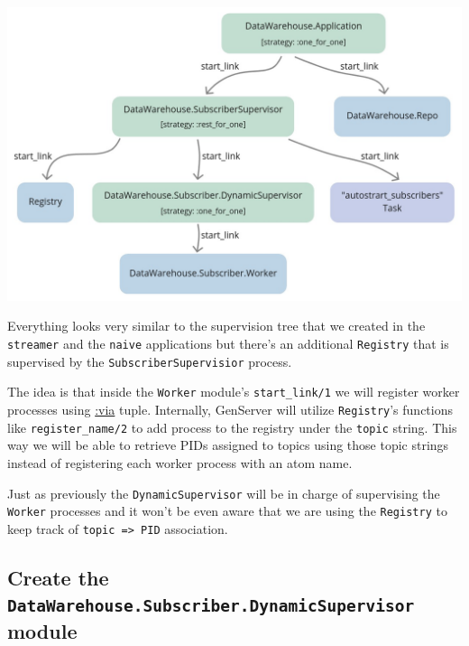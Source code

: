 \documentclass[
  oneside]{book}
\begin{document}
\begin{center}\includegraphics[width=1\linewidth,height=0.4\textheight]{images/chapter_14_01_sup_diagram} \end{center}

Everything looks very similar to the supervision tree that we created in the \texttt{streamer} and the \texttt{naive} applications but there's an additional \texttt{Registry} that is supervised by the \texttt{SubscriberSupervisior} process.

The idea is that inside the \texttt{Worker} module's \texttt{start\_link/1} we will register worker processes using \href{https://hexdocs.pm/elixir/master/GenServer.html\#module-name-registration}{:via} tuple. Internally, GenServer will utilize \texttt{Registry}'s functions like \texttt{register\_name/2} to add process to the registry under the \texttt{topic} string. This way we will be able to retrieve PIDs assigned to topics using those topic strings instead of registering each worker process with an atom name.

Just as previously the \texttt{DynamicSupervisor} will be in charge of supervising the \texttt{Worker} processes and it won't be even aware that we are using the \texttt{Registry} to keep track of \texttt{topic\ =\textgreater{}\ PID} association.

\subsection{\texorpdfstring{Create the \texttt{DataWarehouse.Subscriber.DynamicSupervisor} module}{Create the DataWarehouse.Subscriber.DynamicSupervisor module}}\label{create-the-datawarehouse.subscriber.dynamicsupervisor-module}
\end{document}
